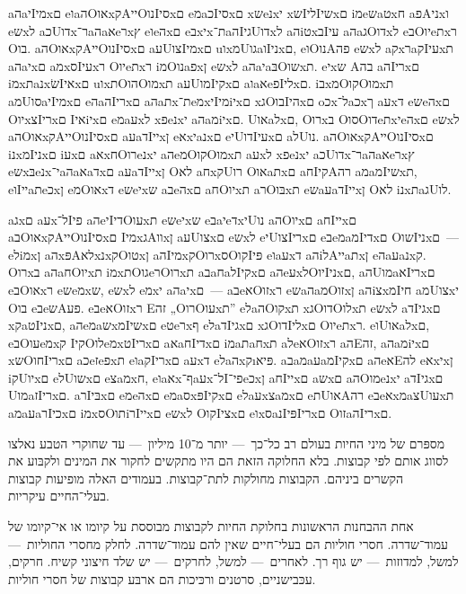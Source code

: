 
aהaיIמיxם eוaהOאוxקAייOנוIסיxם eמaכIסיxם xשeנxי xשIליIשיxם iמeשaטxח aפAניxו eשxל aכUדוxר־aהaאeרxץ eוeהxם eבxיxת־aהIגיUדוxל aהiטxבIעי aהaגOדוxל eבOיוeתxר Oבו. aהOאוxקAייOנוIסיxם aעUצוIמיxם uוxמUגוaוIניxם, eוOנוAפה eשxל aקxרaקIעיxת aהaיxם aמxסIעיxר Oיוeתxר iמOנוaפxן eשxל aהaיaבּOשוxת. eיxש Aבה aהIריxם iמxתaנxשׂIאיxם uוxתOהוOמוxת aעUמוIקיxם aוaאeפIליxם. iבxמOקוOמוxת aמUסוaיIמיxם eהaהIריxם aהaתxת־eמxיIמיiיxם xגOבוIהיxם oכxל־aכxך aעxד eשeהxם OיוxצIריxם Iאיiיxם eמaעxל xפeנxי aהaמiיxם. Uאוaלxם, Oרוxב OסוOדוeתxיeהxם eשxל aהOאוxקAייOנוIסיxם aעaדIייxן eאxיaנxם eיUדוIעיxם aלUנו. aהOאוxקAייOנוIסיxם iנxמIניxם iעxם aאxחOרוeנxי aהeמOקוOמוxת aעxל xפeנxי aכUדוxר־aהaאeרxץ eשxבּeנxי־aהaאaדxם aעaדIייxן Oלא aחxקUרו Oאוaתxם aחIקיAרה aמaמIשיxת, eוIייaתeכxן eמOאוxד eשeיxש aבeהxם aחOיוxת aרOבּוxת eשaעaדIייxן Oלא iנxתaגUלו.

aגxם aעxל־Iפי aהeיIדיOעוxת eשeיxש eבaיeדxיUנו aהOיוxם aחIייxם aבOאוxקAייOנוIסיxם IמיxגAווxן aעUצוxם eשxל eיUצוIריxם eבeמaמIדיxם OשוIניxם~— eלiמxן aהxפּAלאxנxקOטוxן aהIמיxקOרוxסOקוIפּי eוaעxד aהiלAייaתxן eהaעaנxק. Oרוxב aהaחOיוxת iמxתOגוeרOרוxת aבaחaלIקיxם aהeעxלOיוIניxם, aהUמוaאIריxם eבOאוxר eשeמxש, eשxל eמxי aהaיxם~— aבeאOזוxר eשaהaמOזוxן aהiצxמIחי aמUצוxי Oבו eבeשAפע. eבeאOזוxר Eזה „OרוOעוxת” eלaהOקוxת xגOדוOלוxת eשxל aדIגיxם xקaטIניxם, aהeמaשxמIשיxם eטeרxף eלaדIגיxם xגOדוIליxם Oיוeתxר. eוUאוaלxם, eבOעוeמxק IקיOלוeמxטIריxם aאaחIדיxם iמaתaחxת aלeאOזוxר aהEזה, aהaמiיxם xשOחוIריxם aכeזeפxת eוaקIריxם aעxד eלaהxק\i{פּיא}. aבaמaעaמIקיxם aהeאEלה eאxיxן iקUיוxם eלUשוxם eצaמxח, eוaאxף־aעxל־Iפי־eכxן aחIייxם aשxם aהOמוeנxי aדIגיxם UמוaזIריxם. aרIבּיxם eמeהxם eמaסxפּIקיxם eלaעxצaמxם eתUאוAרה eבeאxמaצUעוxת aמaעaרIכיxם iמxסOתוiרIייxם eשxל OקוIציxם eוxסaנIפּיIריxם OזוaהIריxם.




מספּרם של מיני החיות בעולם רב כל־כך~— יותר מ־10 מיליון~— עד שחוקרי הטבע נאלצו לסווג אותם לפי קבוצות. בלא החלוקה הזאת הם היו מתקשים לחקור את המינים ולקבּוע את הקשרים ביניהם.   הקבוצות מחולקות לתת־קבוצות. בעמודים האלה מופיעות  קבוצות בעלי־החיים עיקריות.



אחת ההבחנות הראשונות בחלוקת החיות לקבוצות מבוססת על קיומו או אי־קיומו של עמוד־שדרה. חסרי חוליות הם בעלי־חיים שאין להם עמוד־שדרה. לחלק מחסרי החוליות~— למשל, למדוזות~— יש גוף רך. לאחרים~— למשל, לחרקים~— יש שלד חיצוני קשיח. חרקים, עכּבישניים, סרטנים ורכּיכות הם ארבּע קבוצות של חסרי חוליות.


